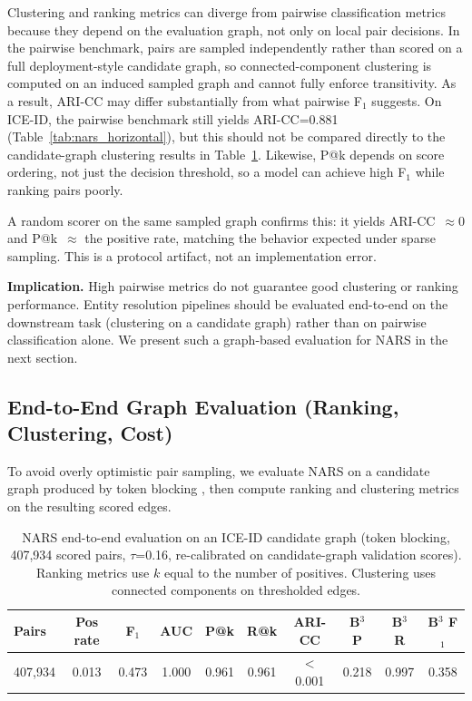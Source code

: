 \documentclass{article}
\begin{document}
Clustering and ranking metrics can diverge from pairwise classification metrics because they depend on the evaluation graph, not only on local pair decisions. In the pairwise benchmark, pairs are sampled independently rather than scored on a full deployment-style candidate graph, so connected-component clustering is computed on an induced sampled graph and cannot fully enforce transitivity. As a result, ARI-CC may differ substantially from what pairwise F$_1$ suggests. On ICE-ID, the pairwise benchmark still yields ARI-CC=0.881 (Table~\ref{tab:nars_horizontal}), but this should not be compared directly to the candidate-graph clustering results in Table~\ref{tab:nars_graph_eval}. Likewise, P@k depends on score ordering, not just the decision threshold, so a model can achieve high F$_1$ while ranking pairs poorly.

A random scorer on the same sampled graph confirms this: it yields ARI-CC~$\approx 0$ and P@k~$\approx$ the positive rate, matching the behavior expected under sparse sampling. This is a protocol artifact, not an implementation error.

\textbf{Implication.} High pairwise metrics do not guarantee good clustering or ranking performance. Entity resolution pipelines should be evaluated end-to-end on the downstream task (clustering on a candidate graph) rather than on pairwise classification alone. We present such a graph-based evaluation for NARS in the next section.

\subsection{End-to-End Graph Evaluation (Ranking, Clustering, Cost)}
\label{sec:nars_graph_eval}

To avoid overly optimistic pair sampling, we evaluate NARS on a candidate graph produced by token blocking \cite{Papadakis2019ASO, Christen2012ASO, Michelson2006LearningBS}, then compute ranking and clustering metrics on the resulting scored edges.

\begin{table}[H]
  \centering
  \small
  \caption{NARS end-to-end evaluation on an ICE-ID candidate graph (token blocking, 407{,}934 scored pairs, $\tau$=0.16, re-calibrated on candidate-graph validation scores). Ranking metrics use $k$ equal to the number of positives. Clustering uses connected components on thresholded edges.}
  \label{tab:nars_graph_eval}

  \begin{tabular}{lccccccccc}
    \toprule
    \textbf{Pairs} & \textbf{Pos rate} & \textbf{F$_1$} & \textbf{AUC} & \textbf{P@k} & \textbf{R@k} & \textbf{ARI-CC} & \textbf{B$^3$ P} & \textbf{B$^3$ R} & \textbf{B$^3$ F$_1$} \\
    \midrule
    407{,}934 & 0.013 & 0.473 & 1.000 & 0.961 & 0.961 & $<$0.001 & 0.218 & 0.997 & 0.358 \\
    \bottomrule
  \end{tabular}
\end{table}
\end{document}

